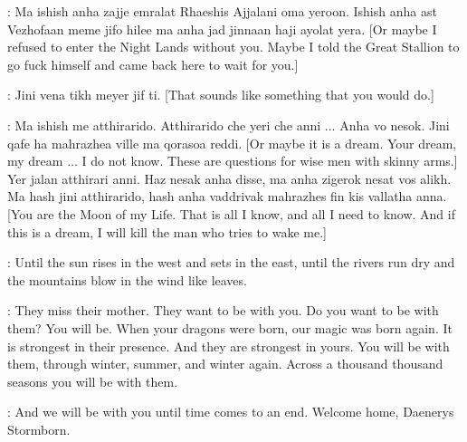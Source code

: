 \DROGO: Ma ishish anha zajje emralat Rhaeshis Ajjalani oma yeroon. Ishish anha ast Vezhofaan meme jifo hilee ma anha jad jinnaan haji ayolat yera. [Or maybe I refused to enter the Night Lands without you. Maybe I told the Great Stallion to go fuck himself and came back here to wait for you.]  

\DAENERYS: Jini vena tikh meyer jif ti. [That sounds like something that you would do.]


\DROGO: Ma ishish me atthirarido. Atthirarido che yeri che anni $\ldots$ Anha vo nesok.  Jini qafe ha mahrazhea ville ma qorasoa reddi. [Or maybe it is a dream. Your dream, my dream $\ldots$ I do not know. These are questions for wise men with skinny arms.] Yer jalan atthirari anni. Haz nesak anha disse, ma anha zigerok nesat vos alikh.  Ma hash jini atthirarido, hash anha vaddrivak mahrazhes fin kis vallatha anna. [You are the Moon of my Life. That is all I know, and all I need to know. And if this is a dream, I will kill the man who tries to wake me.] 




\DAENERYS: Until the sun rises in the west and sets in the east, until the rivers run dry and the mountains blow in the wind like leaves.

 
\PYAT: They miss their mother. They want to be with you. Do you want to be with them? You will be. When your dragons were born, our magic was born again. It is strongest in their presence. And they are strongest in yours. You will be with them, through winter, summer, and winter again. Across a thousand thousand seasons you will be with them. 


\PYAT: And we will be with you until time comes to an end. Welcome home, Daenerys Stormborn. 

